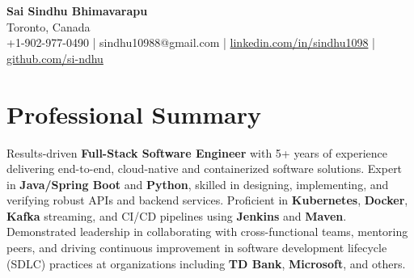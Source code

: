 \documentclass[letterpaper,11pt]{article}
\begin{document}
\begin{center}
  {\Large \textbf{Sai Sindhu Bhimavarapu}} \\
  Toronto, Canada \\
  +1-902-977-0490 \enspace | \enspace sindhu10988@gmail.com \enspace | \enspace \href{https://www.linkedin.com/in/sindhu1098/}{linkedin.com/in/sindhu1098} \enspace | \enspace \href{https://github.com/si-ndhu}{github.com/si-ndhu}
\end{center}

\section{Professional Summary}
  \begin{itemize}[leftmargin=0.15in, label={}]
    \small{\item{
     Results-driven \textbf{Full-Stack Software Engineer} with 5+ years of experience delivering end-to-end, cloud-native and containerized software solutions. Expert in \textbf{Java/Spring Boot} and \textbf{Python}, skilled in designing, implementing, and verifying robust APIs and backend services. Proficient in \textbf{Kubernetes}, \textbf{Docker}, \textbf{Kafka} streaming, and CI/CD pipelines using \textbf{Jenkins} and \textbf{Maven}. Demonstrated leadership in collaborating with cross-functional teams, mentoring peers, and driving continuous improvement in software development lifecycle (SDLC) practices at organizations including \textbf{TD Bank}, \textbf{Microsoft}, and others.
    }}
  \end{itemize}
\vspace{-16pt}

\end{document}
